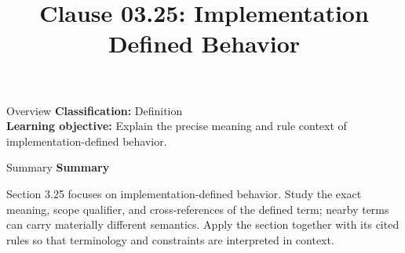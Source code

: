\documentclass[10pt,letterpaper]{article}
\title{Clause 03.25: Implementation Defined Behavior}
\author{}
\date{}
\begin{document}
\maketitle
\begin{CornellOverviewBox}{Overview}
\textbf{Classification:} Definition\\[2pt]
\textbf{Learning objective:} Explain the precise meaning and rule context of implementation-defined behavior.
\end{CornellOverviewBox}\begin{CornellSummaryBox}{Summary}
{\sffamily\bfseries\color{Accent} Summary}\par\vspace{3pt}Section 3.25 focuses on implementation-defined behavior. Study the exact meaning, scope qualifier, and cross-references of the defined term; nearby terms can carry materially different semantics. Apply the section together with its cited rules so that terminology and constraints are interpreted in context.
\end{CornellSummaryBox}
\end{document}
